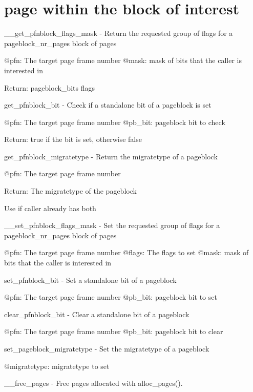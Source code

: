 \chapter{page within the block of interest }
\hypertarget{_the}{}\label{_the}
\+\_\+\+\_\+get\+\_\+pfnblock\+\_\+flags\+\_\+mask -\/ Return the requested group of flags for a pageblock\+\_\+nr\+\_\+pages block of pages  

@pfn:\+ The target page frame number @mask:\+ mask of bits that the caller is interested in

Return:\+ pageblock\+\_\+bits flags

get\+\_\+pfnblock\+\_\+bit -\/ Check if a standalone bit of a pageblock is set  

@pfn:\+ The target page frame number @pb\+\_\+bit:\+ pageblock bit to check

Return:\+ true if the bit is set, otherwise false

get\+\_\+pfnblock\+\_\+migratetype -\/ Return the migratetype of a pageblock  

@pfn:\+ The target page frame number

Return:\+ The migratetype of the pageblock

Use  if caller already has both

\+\_\+\+\_\+set\+\_\+pfnblock\+\_\+flags\+\_\+mask -\/ Set the requested group of flags for a pageblock\+\_\+nr\+\_\+pages block of pages  

@pfn:\+ The target page frame number @flags:\+ The flags to set @mask:\+ mask of bits that the caller is interested in

set\+\_\+pfnblock\+\_\+bit -\/ Set a standalone bit of a pageblock  

@pfn:\+ The target page frame number @pb\+\_\+bit:\+ pageblock bit to set

clear\+\_\+pfnblock\+\_\+bit -\/ Clear a standalone bit of a pageblock  

@pfn:\+ The target page frame number @pb\+\_\+bit:\+ pageblock bit to clear

set\+\_\+pageblock\+\_\+migratetype -\/ Set the migratetype of a pageblock  

@migratetype:\+ migratetype to set

\+\_\+\+\_\+free\+\_\+pages -\/ Free pages allocated with alloc\+\_\+pages().  

